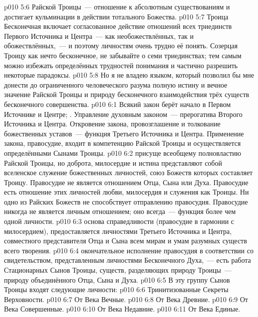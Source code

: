 \vs p010 5:6  Райской Троицы~--- отношение к абсолютным существованиям и достигает кульминации в действии тотального Божества.
\vs p010 5:7 \pc Троица Бесконечная включает согласованное действие отношений всех триединств Первого Источника и Центра~--- как необожествлённых, так и обожествлённых,~--- и поэтому личностям очень трудно её понять. Созерцая Троицу как нечто бесконечное, не забывайте о семи триединствах; тем самым можно избежать определённых трудностей понимания и частично разрешить некоторые парадоксы.
\vs p010 5:8 \pc Но я не владею языком, который позволил бы мне донести до ограниченного человеческого разума полную истину и вечное значение Райской Троицы и природу бесконечного взаимодействия трёх существ бесконечного совершенства.
\vs p010 6:1 Всякий закон берёт начало в Первом Источнике и Центре; . Управление духовным законом~--- прерогатива Второго Источника и Центра. Откровение закона, провозглашение и толкование божественных уставов~--- функция Третьего Источника и Центра. Применение закона, правосудие, входит в компетенцию Райской Троицы и осуществляется определёнными Сынами Троицы.
\vs p010 6:2 \pc {} присуще всеобщему полновластию Райской Троицы, но доброта, милосердие и истина представляют собой вселенское служение божественных личностей, союз Божеств которых составляет Троицу. Правосудие не является отношением Отца, Сына или Духа. Правосудие есть отношение этих личностей любви, милосердия и служения как Троицы. Ни одно из Райских Божеств не способствует отправлению правосудия. Правосудие никогда не является личным отношением; оно всегда~--- функция более чем одной личности.
\vs p010 6:3 \pc {} основа справедливости (правосудие в гармонии с милосердием), предоставляется личностями Третьего Источника и Центра, совместного представителя Отца и Сына всем мирам и умам разумных существ всего творения.
\vs p010 6:4 \pc {} окончательное исполнение правосудия в соответствии со свидетельством, представленным личностями Бесконечного Духа,~--- есть работа Стационарных Сынов Троицы, существ, разделяющих природу Троицы~--- природу объединённого Отца, Сына и Духа.
\vs p010 6:5 \pc В эту группу Сынов Троицы входят следующие личности:
\vs p010 6:6 Тринитизованные Секреты Верховности.
\vs p010 6:7 От Века Вечные.
\vs p010 6:8 От Века Древние.
\vs p010 6:9 От Века Совершенные.
\vs p010 6:10 От Века Недавние.
\vs p010 6:11 От Века Единые.
